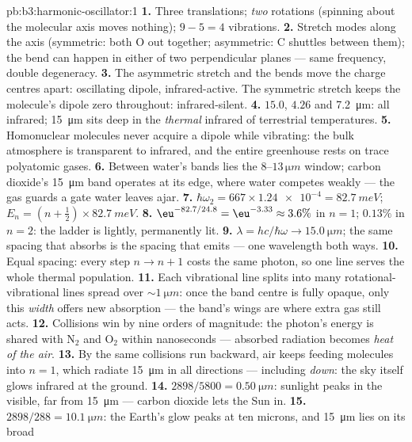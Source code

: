 \begin{solution}{pb:b3:harmonic-oscillator:1}
\textbf{1.} Three translations; \emph{two} rotations (spinning about
the molecular axis moves nothing); $9 - 5 = 4$ vibrations.
\textbf{2.} Stretch modes along the axis (symmetric: both O out
together; asymmetric: C shuttles between them); the bend can happen
in either of two perpendicular planes --- same frequency, double
degeneracy.
\textbf{3.} The asymmetric stretch and the bends move the charge
centres apart: oscillating dipole, infrared-active. The symmetric
stretch keeps the molecule's dipole zero throughout:
infrared-silent.
\textbf{4.} $15.0$, $4.26$ and \qty{7.2}{\micro m}: all infrared;
\qty{15}{\micro m} sits deep in the \emph{thermal} infrared of
terrestrial temperatures.
\textbf{5.} Homonuclear molecules never acquire a dipole while
vibrating: the bulk atmosphere is transparent to infrared, and the
entire greenhouse rests on trace polyatomic gases.
\textbf{6.} Between water's bands lies the $8$--$13\,\unit{\micro m}$
window; carbon dioxide's \qty{15}{\micro m} band operates at its
edge, where water competes weakly --- the gas guards a gate water
leaves ajar.
\textbf{7.} $\hbar\omega_2 = 667 \times \num{1.24e-4} =
\qty{82.7}{meV}$; $E_n = (n + \tfrac12) \times \qty{82.7}{meV}$.
\textbf{8.} $\eu^{-82.7/24.8} = \eu^{-3.33} \approx 3.6\%$ in $n =
1$; $0.13\%$ in $n = 2$: the ladder is lightly, permanently lit.
\textbf{9.} $\lambda = hc/\hbar\omega \to \qty{15.0}{\micro m}$; the
same spacing that absorbs is the spacing that emits --- one
wavelength both ways.
\textbf{10.} Equal spacing: every step $n \to n + 1$ costs the same
photon, so one line serves the whole thermal population.
\textbf{11.} Each vibrational line splits into many
rotational-vibrational lines spread over $\sim\qty{1}{\micro m}$:
once the band centre is fully opaque, only this \emph{width} offers
new absorption --- the band's wings are where extra gas still acts.
\textbf{12.} Collisions win by nine orders of magnitude: the
photon's energy is shared with N$_2$ and O$_2$ within nanoseconds
--- absorbed radiation becomes \emph{heat of the air}.
\textbf{13.} By the same collisions run backward, air keeps
feeding molecules into $n = 1$, which radiate \qty{15}{\micro m} in
all directions --- including \emph{down}: the sky itself glows
infrared at the ground.
\textbf{14.} $2898/5800 = \qty{0.50}{\micro m}$: sunlight peaks in
the visible, far from \qty{15}{\micro m} --- carbon dioxide lets the
Sun in.
\textbf{15.} $2898/288 = \qty{10.1}{\micro m}$: the Earth's glow
peaks at ten microns, and \qty{15}{\micro m} lies on its broad

\end{solution}
